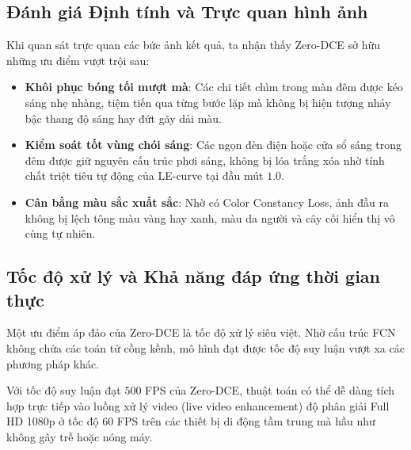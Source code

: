 \documentclass[a4paper]{article}
\begin{document}
\subsection{Đánh giá Định tính và Trực quan hình ảnh}
Khi quan sát trực quan các bức ảnh kết quả, ta nhận thấy Zero-DCE sở hữu những ưu điểm vượt trội sau:
\begin{itemize}
    \item \textbf{Khôi phục bóng tối mượt mà}: Các chi tiết chìm trong màn đêm được kéo sáng nhẹ nhàng, tiệm tiến qua từng bước lặp mà không bị hiện tượng nhảy bậc thang độ sáng hay đứt gãy dải màu.
    \item \textbf{Kiểm soát tốt vùng chói sáng}: Các ngọn đèn điện hoặc cửa sổ sáng trong đêm được giữ nguyên cấu trúc phơi sáng, không bị lóa trắng xóa nhờ tính chất triệt tiêu tự động của LE-curve tại đầu mút $1.0$.
    \item \textbf{Cân bằng màu sắc xuất sắc}: Nhờ có Color Constancy Loss, ảnh đầu ra không bị lệch tông màu vàng hay xanh, màu da người và cây cối hiển thị vô cùng tự nhiên.
\end{itemize}

\subsection{Tốc độ xử lý và Khả năng đáp ứng thời gian thực}
Một ưu điểm áp đảo của Zero-DCE là tốc độ xử lý siêu việt. Nhờ cấu trúc FCN không chứa các toán tử cồng kềnh, mô hình đạt được tốc độ suy luận vượt xa các phương pháp khác.

\begin{table}[H]
\centering
\caption{So sánh tốc độ xử lý (Frame Per Second - FPS) trên các phần cứng khác nhau}
\label{tab:speed_comparison}
\setlength{\tabcolsep}{5pt}
\end{table}

Với tốc độ suy luận đạt $500$ FPS của Zero-DCE, thuật toán có thể dễ dàng tích hợp trực tiếp vào luồng xử lý video (live video enhancement) độ phân giải Full HD 1080p ở tốc độ 60 FPS trên các thiết bị di động tầm trung mà hầu như không gây trễ hoặc nóng máy.
\end{document}
